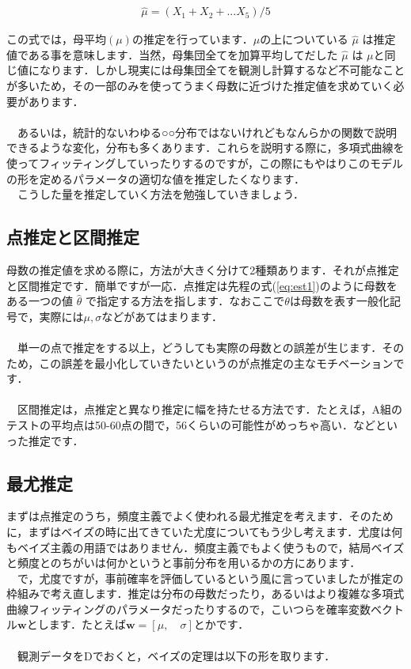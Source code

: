 \documentclass[11pt,a4paper]{jsarticle}                    %
\begin{document}
\begin{eqnarray}
\label{eq:est1}
\hat \mu = (X_1 + X_2 + ... X_5)/5
\end{eqnarray}

この式では，母平均$(\mu)$の推定を行っています．$\mu$の上についている $\hat \mu$ は推定値である事を意味します．当然，母集団全てを加算平均してだした $\hat \mu$ は $\mu$と同じ値になります．しかし現実には母集団全てを観測し計算するなど不可能なことが多いため，その一部のみを使ってうまく母数に近づけた推定値を求めていく必要があります．\\
\\
　あるいは，統計的ないわゆる○○分布ではないけれどもなんらかの関数で説明できるような変化，分布も多くあります．これらを説明する際に，多項式曲線を使ってフィッティングしていったりするのですが，この際にもやはりこのモデルの形を定めるパラメータの適切な値を推定したくなります．\\
　こうした量を推定していく方法を勉強していきましょう．\\

\subsection{点推定と区間推定}
母数の推定値を求める際に，方法が大きく分けて2種類あります．それが点推定と区間推定です．簡単ですが一応．点推定は先程の式(\ref{eq:est1})のように母数をある一つの値 $\hat \theta$ で指定する方法を指します．なおここで$\theta$は母数を表す一般化記号で，実際には$\mu, \sigma$などがあてはまります．\\
\\
　単一の点で推定をする以上，どうしても実際の母数との誤差が生じます．そのため，この誤差を最小化していきたいというのが点推定の主なモチベーションです．\\
\\
　区間推定は，点推定と異なり推定に幅を持たせる方法です．たとえば，A組のテストの平均点は50-60点の間で，56くらいの可能性がめっちゃ高い．などといった推定です．

\subsection{最尤推定}
まずは点推定のうち，頻度主義でよく使われる最尤推定を考えます．そのために，まずはベイズの時に出てきていた尤度についてもう少し考えます．尤度は何もベイズ主義の用語ではありません．頻度主義でもよく使うもので，結局ベイズと頻度とのちがいは何かというと事前分布を用いるかの方にあります．\\
　で，尤度ですが，事前確率を評価しているという風に言っていましたが推定の枠組みで考え直します．推定は分布の母数だったり，あるいはより複雑な多項式曲線フィッティングのパラメータだったりするので，こいつらを確率変数ベクトル$\mathbf{w}$とします．たとえば$\mathbf{w} = [\mu, \quad \sigma]$とかです．\\
\\
　観測データをDでおくと，ベイズの定理は以下の形を取ります．
\end{document}
